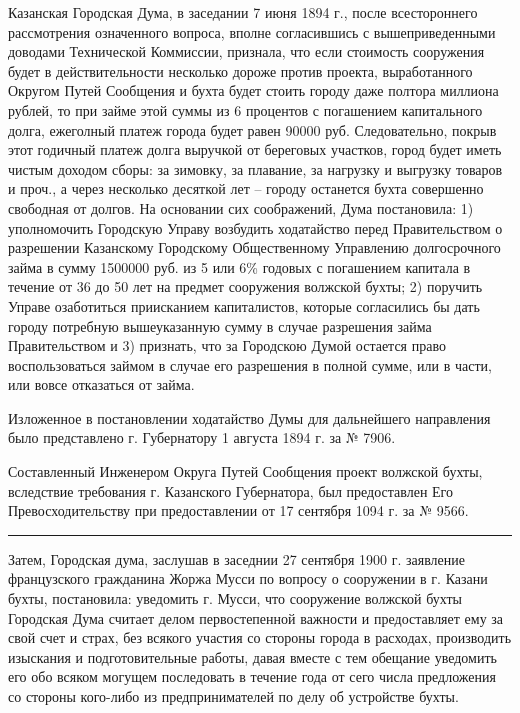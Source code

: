 \documentclass[oneside,final,14pt]{extreport}
\begin{document}
Казанская Городская Дума, в заседании 7 июня 1894 г., после всестороннего рассмотрения означенного вопроса, вполне согласившись с вышеприведенными доводами Технической Коммиссии, признала, что если стоимость сооружения будет в действительности несколько дороже против проекта, выработанного Округом Путей Сообщения и бухта будет стоить городу даже полтора миллиона рублей, то при займе этой суммы из 6 процентов с погашением капитального долга, ежеголный платеж города будет равен 90000 руб. Следовательно, покрыв этот годичный платеж долга выручкой от береговых участков, город будет иметь чистым доходом сборы: за зимовку, за плавание, за нагрузку и выгрузку товаров и проч., а через несколько десяткой лет -- городу останется бухта совершенно свободная от долгов. На основании сих соображений, Дума постановила: 1) уполномочить Городскую Управу возбудить ходатайство перед Правительством о разрешении Казанскому Городскому Общественному Управлению долгосрочного займа в сумму 1500000 руб. из 5 или 6\% годовых с погашением капитала в течение от 36 до 50 лет на предмет сооружения волжской бухты; 2) поручить Управе озаботиться приисканием капиталистов, которые согласились бы дать городу потребную вышеуказанную сумму в случае разрешения займа Правительством и 3) признать, что за Городскою Думой остается право воспользоваться займом в случае его разрешения в полной сумме, или в части, или вовсе отказаться от займа.

Изложенное в постановлении ходатайство Думы для дальнейшего направления было представлено г. Губернатору 1 августа 1894 г. за № 7906.

Составленный Инженером Округа Путей Сообщения проект волжской бухты, вследствие требования г. Казанского Губернатора, был предоставлен Его Превосходительству при предоставлении от 17 сентября 1094 г. за № 9566.
\begin{center}
\noindent\rule{4cm}{0.4pt}
\end{center}

Затем, Городская дума, заслушав в заседнии 27 сентября 1900 г. заявление французского гражданина Жоржа Мусси по вопросу о сооружении в г. Казани бухты, постановила: уведомить г. Мусси, что сооружение волжской бухты Городская Дума считает делом первостепенной важности и предоставляет ему за свой счет и страх, без всякого участия со стороны города в расходах, производить изыскания и подготовительные работы, давая вместе с тем обещание уведомить его обо всяком могущем последовать в течение года от сего числа предложения со стороны кого-либо из предпринимателей по делу об устройстве бухты.
\end{document}
